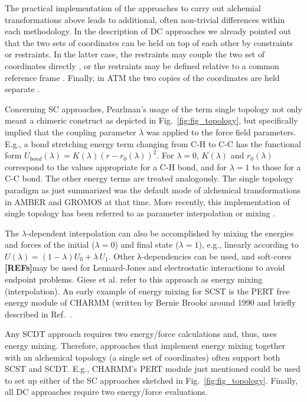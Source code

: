 \documentclass[9pt,bestpractices,pubversion]{livecoms}
\newcommand{\rref}{{\bfseries[REFs]}{}}
\begin{document}
The practical implementation of the approaches to carry out alchemial transformations above leads to additional, often non-trivial differences within each methodology. In the description of DC approaches we already pointed out that the two sets of coordinates can be held on top of each other by constraints \cite{jiang2019computing,Lee_2023} or restraints. In the latter case, the restraints may couple the two set of coordinates directly \cite{Axelsen_1998,Ries_2022}, or the restraints may be defined relative to a common reference frame \cite{rocklin2013separated,Baumann_2023}. Finally, in ATM the two copies of the coordinates are held separate \cite{Azimi_2022}.

Concerning SC approaches, Pearlman’s usage of the term single topology not only meant a chimeric construct as depicted in Fig.~\ref{fig:fig_topology}, but specifically implied that the coupling parameter $\lambda$ was applied to the force field parameters. E.g., a bond stretching energy term changing from C-H to C-C has the functional form $U_{bond}(\lambda)=K(\lambda)(r-r_0(\lambda))^2$. For $\lambda=0$, $K(\lambda)$ and $r_0(\lambda)$ correspond to the values appropriate for a C-H bond, and for $\lambda=1$ to those for a C-C bond. The other energy terms are treated analogously. The single topology paradigm as just summarized was the default mode of alchemical transformations in AMBER and GROMOS at that time.  More recently, this implementation of single topology has been referred to as parameter interpolation or mixing \cite{Giese_2018}. 

The $\lambda$-dependent interpolation can also be accomplished by mixing the energies and forces of the initial ($\lambda=0$) and final state ($\lambda=1$), e.g., linearly according to $U(\lambda)=(1-\lambda) U_0+\lambda\,U_1$. Other λ-dependencies can be used, and soft-cores \rref may be used for Lennard-Jones and electrostatic interactions to avoid endpoint problems. Giese et al. \cite{Giese_2018} refer to this approach as energy mixing (interpolation).%
An early example of energy mixing for SCST is the PERT free energy module of CHARMM (written by Bernie Brooks around 1990 and briefly described in Ref.~\cite{brooks_2009}.

Any SCDT approach requires two energy/force calculations and, thus, uses energy mixing. Therefore, approaches that implement energy mixing together with an alchemical topology (a single set of coordinates) often support both SCST and SCDT. E.g., CHARMM's PERT module just mentioned could be used to set up either of the SC approaches sketched in Fig.~\ref{fig:fig_topology}. Finally, all DC approaches require two energy/force evaluations.
\end{document}
